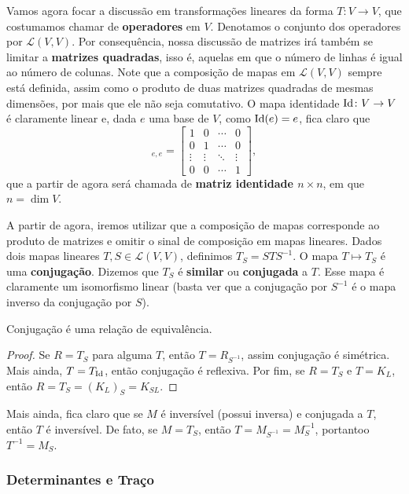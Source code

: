 Vamos agora focar a discussão em transformações lineares da forma $T \colon V \to V$, que costumamos chamar de \textbf{operadores} em $V$. Denotamos o conjunto dos operadores por $\mathcal{L}(V,V)$. Por consequência, nossa discussão de matrizes irá também se limitar a \textbf{matrizes quadradas}, isso é, aquelas em que o número de linhas é igual ao número de colunas. Note que a composição de mapas em $\mathcal{L}(V,V)$ sempre está definida, assim como o produto de duas matrizes quadradas de mesmas dimensões, por mais que ele não seja comutativo. O mapa identidade $\operatorname{Id} \colon V \to V$ é claramente linear e, dada $e$ uma base de $V$, como $\operatorname{Id}(e) = e$, fica claro que \begin{equation}
    [\Id]_{e,e} = \begin{bmatrix}
        1 & 0 & \cdots & 0 \\ 0 & 1 & \cdots & 0 \\ \vdots & \vdots & \ddots & \vdots \\ 0 & 0 & \cdots & 1
    \end{bmatrix},
\end{equation} que a partir de agora será chamada de \textbf{matriz identidade $n \times n$}, em que $n = \dim V$.

A partir de agora, iremos utilizar que a composição de mapas corresponde ao produto de matrizes e omitir o sinal de composição em mapas lineares. Dados dois mapas lineares $T, S \in \mathcal{L}(V,V)$, definimos $T_S = STS^{-1}$. O mapa $T \mapsto T_S$ é uma \textbf{conjugação}. Dizemos que $T_S$ é \textbf{similar} ou \textbf{conjugada} a $T$. Esse mapa é claramente um isomorfismo linear (basta ver que a conjugação por $S^{-1}$ é o mapa inverso da conjugação por $S$).

\begin{theorem}
    Conjugação é uma relação de equivalência.
\end{theorem}
\begin{proof}
    Se $R = T_S$ para alguma $T$, então $T = R_{S^{-1}}$, assim conjugação é simétrica. Mais ainda, $T = T_{\operatorname{Id}}$, então conjugação é reflexiva. Por fim, se $R = T_S$ e $T = K_L$, então $R = T_S = (K_L)_S = K_{SL}$. 
\end{proof}

Mais ainda, fica claro que se $M$ é inversível (possui inversa) e conjugada a $T$, então $T$ é inversível. De fato, se $M = T_S$, então $T = M_{S^{-1}} = M_S^{-1}$, portantoo $T^{-1} = M_S$.

\subsubsection*{Determinantes e Traço}

